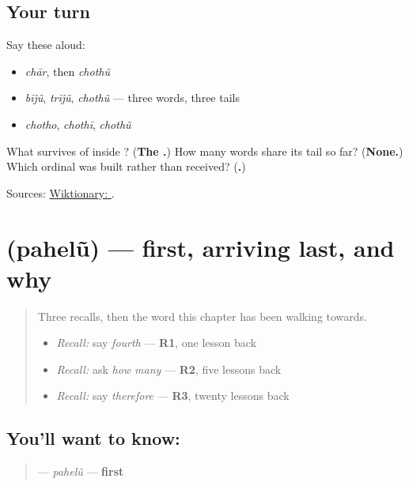\subsection*{Your turn}
Say these aloud:

\begin{itemize}
\raggedright
  \item \emph{chār}, then \emph{chothũ}
  \item \emph{bījũ}, \emph{trījũ}, \emph{chothũ} — three words, three tails
  \item \emph{chotho}, \emph{chothī}, \emph{chothũ}
\end{itemize}

\begin{tcolorbox}[breakable,colback=teal!4,colframe=teal!35!black,title={Before you move on}]
What survives of \textbf{} inside \textbf{}? (\textbf{The .}) How many words share its tail so far? (\textbf{None.}) Which ordinal was built rather than received? (\textbf{.})

Sources: \href{https://en.wiktionary.org/wiki/\%E0\%AA\%9A\%E0\%AB\%8B\%E0\%AA\%A5\%E0\%AB\%81\%E0\%AA\%82}{Wiktionary: }.
\end{tcolorbox}
\section[\texorpdfstring{\gu{પહેલું} (pahelũ)}{પહેલું (pahelũ)}]{ (pahelũ) — first, arriving last, and why}

\label{lesson:GU-C38-pahelu}



\begin{quote}
Three recalls, then the word this chapter has been walking towards.

\begin{itemize}
\raggedright
  \item \emph{Recall:} say \emph{fourth} — \textbf{R1}, one lesson back
  \item \emph{Recall:} ask \emph{how many} — \textbf{R2}, five lessons back
  \item \emph{Recall:} say \emph{therefore} — \textbf{R3}, twenty lessons back
\end{itemize}
\end{quote}

\subsection*{You'll want to know: }
\begin{quote}
\textbf{} — \emph{pahelũ} — \textbf{first}
\end{quote}

